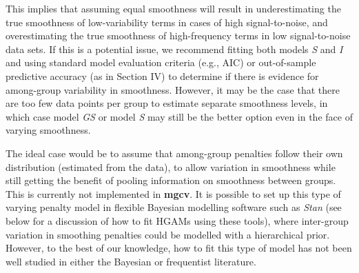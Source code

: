 \documentclass[12pt]{article}
\begin{document}
This implies that assuming equal smoothness will result in
underestimating the true smoothness of low-variability terms in cases of
high signal-to-noise, and overestimating the true smoothness of
high-frequency terms in low signal-to-noise data sets. If this is a
potential issue, we recommend fitting both models \emph{S} and \emph{I}
and using standard model evaluation criteria (e.g., AIC) or
out-of-sample predictive accuracy (as in Section IV) to determine if
there is evidence for among-group variability in smoothness. However, it
may be the case that there are too few data points per group to estimate
separate smoothness levels, in which case model \emph{GS} or model
\emph{S} may still be the better option even in the face of varying
smoothness.

The ideal case would be to assume that among-group penalties follow
their own distribution (estimated from the data), to allow variation in
smoothness while still getting the benefit of pooling information on
smoothness between groups. This is currently not implemented in
\textbf{mgcv}. It is possible to set up this type of varying penalty
model in flexible Bayesian modelling software such as \emph{Stan} (see
below for a discussion of how to fit HGAMs using these tools), where
inter-group variation in smoothing penalties could be modelled with a
hierarchical prior. However, to the best of our knowledge, how to fit
this type of model has not been well studied in either the Bayesian or
frequentist literature.
\end{document}
